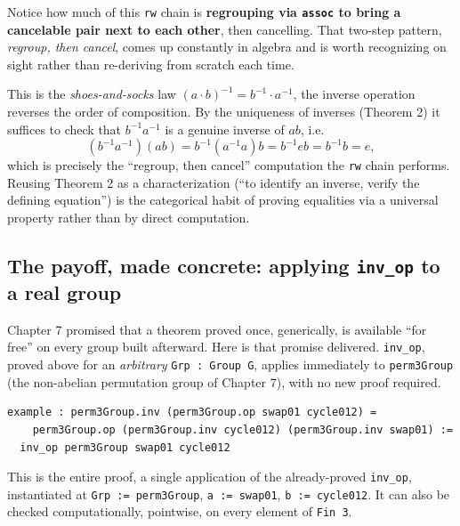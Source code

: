 Notice how much of this \texttt{rw} chain is \textbf{regrouping via \texttt{assoc} to bring a cancelable pair next to each other}, then cancelling. That two-step pattern, \emph{regroup, then cancel}, comes up constantly in algebra and is worth recognizing on sight rather than re-deriving from scratch each time.

\begin{mathreading}

This is the \emph{shoes-and-socks} law \((a\cdot
b)^{-1} = b^{-1}\cdot a^{-1}\), the inverse operation reverses the order of composition. By the uniqueness of inverses (Theorem 2) it suffices to check that \(b^{-1}a^{-1}\) is a genuine inverse of \(ab\), i.e. \[
(b^{-1}a^{-1})(ab) = b^{-1}(a^{-1}a)b = b^{-1}eb = b^{-1}b = e,
\] which is precisely the ``regroup, then cancel'' computation the \texttt{rw} chain performs. Reusing Theorem 2 as a characterization (``to identify an inverse, verify the defining equation'') is the categorical habit of proving equalities via a universal property rather than by direct computation.

\end{mathreading}

\subsection{\texorpdfstring{The payoff, made concrete: applying \texttt{inv\_op} to a real group}{The payoff, made concrete: applying inv\_op to a real group}}\label{sec:08-group-theorems:04-theorem-3:2}

Chapter 7 promised that a theorem proved once, generically, is available ``for free'' on every group built afterward. Here is that promise delivered. \texttt{inv\_\allowbreak{}op}, proved above for an \emph{arbitrary} \texttt{Grp : Group G}, applies immediately to \texttt{perm3Group} (the non-abelian permutation group of Chapter 7), with no new proof required.

\begin{lstlisting}
example : perm3Group.inv (perm3Group.op swap01 cycle012) =
    perm3Group.op (perm3Group.inv cycle012) (perm3Group.inv swap01) :=
  inv_op perm3Group swap01 cycle012
\end{lstlisting}

This is the entire proof, a single application of the already-proved \texttt{inv\_\allowbreak{}op}, instantiated at \texttt{Grp := perm3Group}, \texttt{a := swap01}, \texttt{b := cycle012}. It can also be checked computationally, pointwise, on every element of \texttt{Fin 3}.

